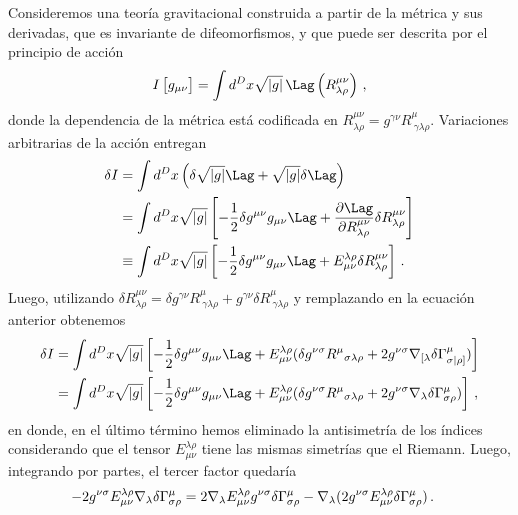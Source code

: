 \documentclass[../Main.tex]{subfiles}
\begin{document}
Consideremos una teoría gravitacional construida a partir de la métrica y sus derivadas, que es invariante de difeomorfismos, y que puede ser descrita por el principio de acción 
\begin{align}
I\left[g_{\mu\nu}\right]=\int d^D x \sqrt{|g|}\, \Lag\left(R_{\lambda \rho}^{\mu \nu}\right)\label{accgeneral} \, ,
\end{align}
donde la dependencia de la métrica está codificada en $R_{\lambda \rho}^{\mu \nu}=g^{\gamma\nu}R^{\mu}_{\ \gamma\lambda\rho}$. Variaciones arbitrarias de la acción entregan
\begin{align}\notag
\delta I &= \int d^D x\left(\delta\sqrt{|g|}\Lag+\sqrt{|g|}\delta\Lag\right)\\ \notag
&=\int d^D x \sqrt{|g|}\left[-\frac{1}{2} \delta g^{ \mu\nu }g_{\mu \nu} \Lag+\frac{\partial \Lag}{\partial R_{\lambda \rho}^{\mu \nu}} \delta R_{\lambda \rho}^{\mu \nu}\right]\\ 
&\equiv\int d^D x \sqrt{|g|}\left[-\frac{1}{2} \delta g^{ \mu\nu }g_{\mu \nu} \Lag+E_{\mu \nu}^{\lambda \rho} \delta R_{\lambda \rho}^{\mu \nu}\right]\, . \label{vargen}
\end{align} 
Luego, utilizando $\delta R_{\lambda \rho}^{\mu \nu}=\delta g^{\gamma\nu}R^{\mu}_{\ \gamma\lambda\rho}+g^{\gamma\nu}\delta R^{\mu}_{\ \gamma\lambda\rho}$ y remplazando en la ecuación anterior obtenemos
\begin{align}\notag
 \delta I&=\int d^D x \sqrt{|g|}\left[-\frac{1}{2} \delta g^{ \mu\nu }g_{\mu \nu} \Lag+E_{\mu \nu}^{\lambda \rho} (\delta g^{\nu \sigma} R^\mu{}_{\sigma \lambda \rho}+2 g^{\nu\sigma} \nabla_{[\lambda} \delta \Gamma_{\sigma |\rho]}^\mu)\right]\\
 &=\int d^D x \sqrt{|g|}\left[-\frac{1}{2} \delta g^{ \mu\nu }g_{\mu \nu} \Lag+E_{\mu \nu}^{\lambda \rho} (\delta g^{\nu \sigma} R^\mu{}_{\sigma \lambda \rho}+2 g^{\nu\sigma} \nabla_{\lambda} \delta \Gamma_{\sigma\rho}^\mu)\right]\, ,
\end{align}
en donde, en el último término hemos eliminado la antisimetría de los índices considerando que el tensor $E_{\mu \nu}^{\lambda \rho}$ tiene las mismas simetrías que el Riemann. Luego, integrando por partes, el tercer factor quedaría
\begin{align}\notag
-2g^{\nu\sigma}E_{\mu \nu}^{\lambda \rho}\nabla_{\lambda} \delta \Gamma_{\sigma\rho}^\mu&=2\nabla_{\lambda}E_{\mu \nu}^{\lambda \rho}g^{\nu\sigma}\delta\Gamma^{\mu}_{\sigma\rho}-\nabla_{\lambda}(2g^{\nu\sigma}E_{\mu \nu}^{\lambda \rho}\delta\Gamma^{\mu}_{\sigma\rho})\, .
\end{align}
\end{document}

